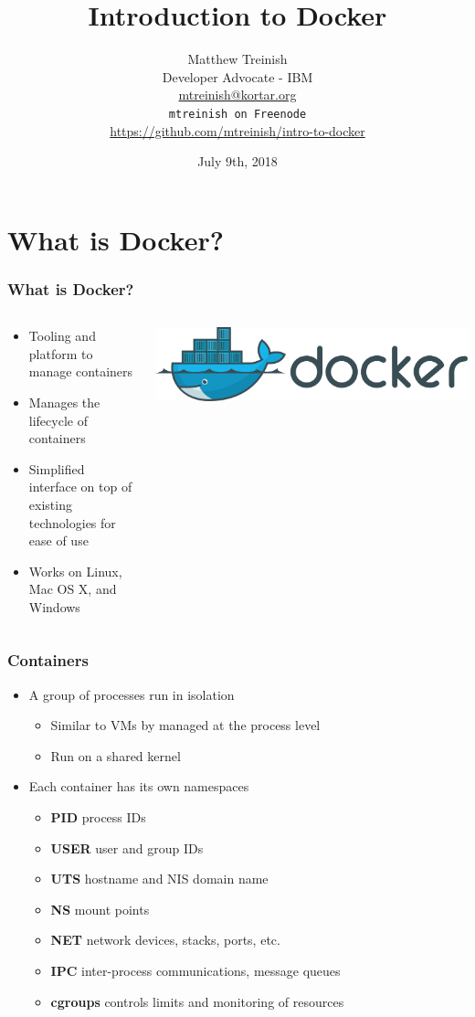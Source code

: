 \documentclass[aspectratio=169,11pt,hyperref={colorlinks=true}]{beamer}
\author[Matthew Treinish]{%
    \texorpdfstring{%
        \centering
        Matthew Treinish\\
        Developer Advocate - IBM \\
        \href{mailto:mtreinish@kortar.org}{mtreinish@kortar.org}\\
        \texttt{mtreinish on Freenode}\\
        \href{https://github.com/mtreinish/intro-to-docker}{https://github.com/mtreinish/intro-to-docker}
   }
   {Matthew Treinish}
}
\date{July 9th, 2018}
\title{Introduction to Docker}
\begin{document}
\titlepage

\section{What is Docker?}
\begin{frame}
    \frametitle{What is Docker?}
    \begin{columns}[T]
        \begin{column}{.48\textwidth}
            \begin{itemize}
                \item Tooling and platform to manage containers
                \item Manages the lifecycle of containers
                \item Simplified interface on top of existing technologies for ease of use
                \item Works on Linux, Mac OS X, and Windows
            \end{itemize}
        \end{column}
        \begin{column}{.48\textwidth}
            \includegraphics[width=.9\textwidth]{Docker_logo.png}
        \end{column} 
    \end{columns}
\end{frame}

\begin{frame}
    \frametitle{Containers}
    \begin{itemize}
    \item A group of processes run in isolation
        \begin{itemize}
            \item Similar to VMs by managed at the process level
            \item Run on a shared kernel
        \end{itemize}
    \item Each container has its own namespaces
        \begin{itemize}
            \item \textbf{PID} process IDs
            \item \textbf{USER} user and group IDs
            \item \textbf{UTS} hostname and NIS domain name
            \item \textbf{NS} mount points
            \item \textbf{NET} network devices, stacks, ports, etc.
            \item \textbf{IPC} inter-process communications, message queues
            \item \textbf{cgroups} controls limits and monitoring of resources
        \end{itemize}
    \end{itemize}
\end{frame}
\end{document}
